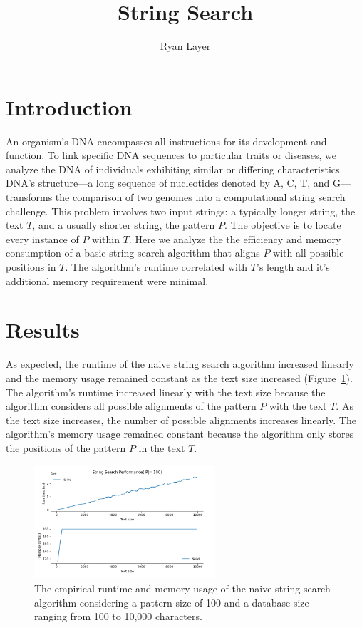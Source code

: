 \documentclass[11pt, letterpaper]{article}
\begin{document}
\title{String Search}
\author{Ryan Layer}
\maketitle

\section{Introduction}
An organism's DNA encompasses all instructions for its development and
function. To link specific DNA sequences to particular traits or diseases, we
analyze the DNA of individuals exhibiting similar or differing characteristics.
DNA's structure—a long sequence of nucleotides denoted by A, C, T, and
G—transforms the comparison of two genomes into a computational string search
challenge. This problem involves two input strings: a typically longer string,
the text $T$, and a usually shorter string, the pattern $P$. The
objective is to locate every instance of $P$ within $T$. Here we analyze the
the efficiency and memory consumption of a basic string search algorithm that
aligns $P$ with all possible positions in $T$.  The algorithm's runtime
correlated with $T$'s length and it's additional memory requirement were
minimal.

\section{Results}

As expected, the runtime of the naive string search algorithm increased
linearly and the memory usage remained constant as the text size increased
(Figure~\ref{timeandmem}). The algorithm's runtime increased linearly with
the text size because the algorithm considers all possible alignments of the
pattern $P$ with the text $T$. As the text size increases, the number of
possible alignments increases linearly. The algorithm's memory usage remained
constant because the algorithm only stores the positions of the pattern $P$ in
the text $T$.


\begin{figure}[ht] \centering
    \includegraphics[width=0.6\textwidth]{naive_search}
    \caption{The empirical runtime and memory usage of the naive string search
    algorithm considering a pattern size of 100 and a database size ranging
    from 100 to 10,000 characters.}
    \label{timeandmem}
\end{figure}
\end{document}
